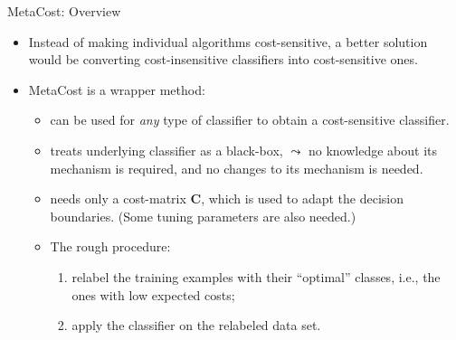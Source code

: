 \documentclass[11pt,compress,t,notes=noshow, xcolor=table]{beamer}
\begin{document}
\begin{vbframe}{MetaCost: Overview}

	\small{
	\begin{itemize}

		\item Instead of making individual algorithms cost-sensitive, a better solution would be converting cost-insensitive classifiers into cost-sensitive ones.

		\item MetaCost is a wrapper method:
        \begin{itemize}
            \small
            \item can be used for \emph{any} type of classifier to obtain a cost-sensitive classifier.
            \vspace{5pt}
            
            \item treats underlying classifier as a black-box, $\leadsto$ no knowledge about its mechanism is required, and no changes to its mechanism is needed.
            \vspace{5pt}
            
            \item needs only a cost-matrix $\mathbf{C}$, which is used to adapt the decision boundaries. {\scriptsize (Some tuning parameters are also needed.)}
            \vspace{5pt}
            
            \item The rough procedure: 
                \begin{enumerate}
                    \small
                    \item relabel the training examples with their ``optimal'' classes, i.e., the ones with low expected costs;
                    \vspace{5pt}
                    
                    \item apply the classifier on the relabeled data set.
                \end{enumerate} 
        \end{itemize}

	\end{itemize}

	}

\end{vbframe}
\end{document}
